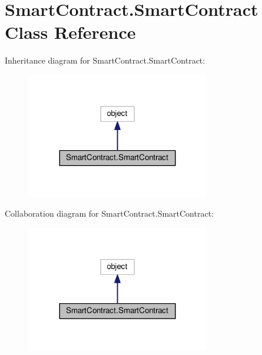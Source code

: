 \hypertarget{class_smart_contract_1_1_smart_contract}{}\section{Smart\+Contract.\+Smart\+Contract Class Reference}
\label{class_smart_contract_1_1_smart_contract}


Inheritance diagram for Smart\+Contract.\+Smart\+Contract\+:\nopagebreak
\begin{figure}[H]
\begin{center}
\leavevmode
\includegraphics[width=227pt]{class_smart_contract_1_1_smart_contract__inherit__graph}
\end{center}
\end{figure}


Collaboration diagram for Smart\+Contract.\+Smart\+Contract\+:\nopagebreak
\begin{figure}[H]
\begin{center}
\leavevmode
\includegraphics[width=227pt]{class_smart_contract_1_1_smart_contract__coll__graph}
\end{center}
\end{figure}
